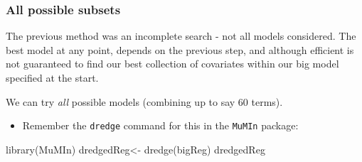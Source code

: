 \documentclass[
  oneside]{krantz}
\newenvironment{Shaded}{\begin{snugshade}}{\end{snugshade}}
\newcommand{\FunctionTok}[1]{\textcolor[rgb]{0.00,0.00,0.00}{#1}}
\newcommand{\NormalTok}[1]{#1}
\newcommand{\OtherTok}[1]{\textcolor[rgb]{0.56,0.35,0.01}{#1}}
\providecommand{\tightlist}{%
  \setlength{\itemsep}{0pt}\setlength{\parskip}{0pt}}
\begin{document}
\hypertarget{all-possible-subsets}{%
\subsubsection{All possible subsets}\label{all-possible-subsets}}

The previous method was an incomplete search - not all models considered. The best model at any point, depends on the previous step, and although efficient is not guaranteed to find our best collection of covariates within our big model specified at the start.

We can try \emph{all} possible models (combining up to say 60 terms).

\begin{itemize}
\tightlist
\item
  Remember the \texttt{dredge} command for this in the \texttt{MuMIn} package:
\end{itemize}

\begin{Shaded}
\begin{Highlighting}[]
\FunctionTok{library}\NormalTok{(MuMIn)}
\NormalTok{dredgedReg}\OtherTok{\textless{}{-}} \FunctionTok{dredge}\NormalTok{(bigReg)}
\NormalTok{dredgedReg}
\end{Highlighting}
\end{Shaded}

\tiny
\end{document}
